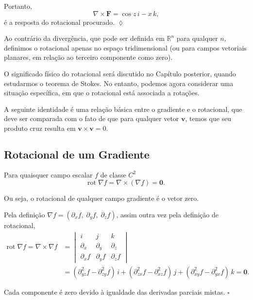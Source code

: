 Portanto,
\begin{equation*}
	\nabla\times \mathbf{F} = \cos z\, i -x\, k,
\end{equation*}
é a resposta do rotacional procurado. \hfill $\lozenge$

Ao contrário da divergência, que pode ser definida em \(\mathbb{R}^{n}\) para qualquer \(n\), definimos o rotacional apenas no espaço
tridimensional (ou para campos vetoriais planares, em relação ao terceiro componente como zero).

O significado físico do rotacional será discutido no Capítulo posterior, quando estudarmos o teorema de Stokes. No entanto, podemos agora considerar
uma situação específica, em que o \textsf{rotacional} está associada a \textsf{rotações}.

\bigskip
A seguinte identidade é uma relação básica entre o gradiente e o rotacional, que deve ser comparada com o fato de que para qualquer vetor $\mathbf{v}$, temos que seu produto cruz resulta em  \(\mathbf{v} \times \mathbf{v} = 0\).

%
\subsection*{Rotacional de um Gradiente}
%
Para quaisquer campo escalar $f$ de classe $C^{2}$
\begin{equation*}
	\mathrm{rot}\; \nabla f = \nabla \times (\nabla f)= \mathbf{0}.
\end{equation*}

Ou seja, o \textsf{rotacional} de qualquer campo gradiente é o vetor zero.

\prova
Pela definição $\nabla f=(\partial_{x}f, \; \partial_{y}f, \; \partial_{z}f )$, assim outra vez pela definição de rotacional,
\begin{align*}
	\mathrm{rot}\; \nabla f =\nabla \times \nabla f &=
	\begin{vmatrix}
		i & j & k \\
		\partial_{x} & \partial_{y} & \partial_{z} \\
		\partial_{x}f & \partial_{y}f & \partial_{z}f
	\end{vmatrix}\\[2ex]
	&=\left(\partial_{yz}^{2}f-\partial_{zy}^{2}f \right)\,i+\left(\partial_{zx}^{2}f-\partial_{xz}^{2}f \right)\,j+\left(\partial_{xy}^{2}f
	-\partial_{yx}^{2}f \right)\,k=\mathbf{0}.
\end{align*}

Cada componente é zero devido à igualdade das derivadas parciais mistas. \hfill $\square$


